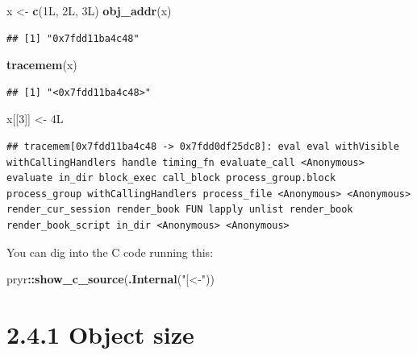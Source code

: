 \documentclass[]{book}
\newenvironment{Shaded}{\begin{snugshade}}{\end{snugshade}}
\newcommand{\DecValTok}[1]{\textcolor[rgb]{0.00,0.00,0.81}{#1}}
\newcommand{\KeywordTok}[1]{\textcolor[rgb]{0.13,0.29,0.53}{\textbf{#1}}}
\newcommand{\NormalTok}[1]{#1}
\newcommand{\OperatorTok}[1]{\textcolor[rgb]{0.81,0.36,0.00}{\textbf{#1}}}
\newcommand{\StringTok}[1]{\textcolor[rgb]{0.31,0.60,0.02}{#1}}
\begin{document}
\begin{Shaded}
\begin{Highlighting}[]
\NormalTok{x <-}\StringTok{ }\KeywordTok{c}\NormalTok{(1L, 2L, 3L)}
\KeywordTok{obj_addr}\NormalTok{(x)}
\end{Highlighting}
\end{Shaded}

\begin{verbatim}
## [1] "0x7fdd11ba4c48"
\end{verbatim}

\begin{Shaded}
\begin{Highlighting}[]
\KeywordTok{tracemem}\NormalTok{(x)}
\end{Highlighting}
\end{Shaded}

\begin{verbatim}
## [1] "<0x7fdd11ba4c48>"
\end{verbatim}

\begin{Shaded}
\begin{Highlighting}[]
\NormalTok{x[[}\DecValTok{3}\NormalTok{]] <-}\StringTok{ }\NormalTok{4L}
\end{Highlighting}
\end{Shaded}

\begin{verbatim}
## tracemem[0x7fdd11ba4c48 -> 0x7fdd0df25dc8]: eval eval withVisible withCallingHandlers handle timing_fn evaluate_call <Anonymous> evaluate in_dir block_exec call_block process_group.block process_group withCallingHandlers process_file <Anonymous> <Anonymous> render_cur_session render_book FUN lapply unlist render_book render_book_script in_dir <Anonymous> <Anonymous>
\end{verbatim}

You can dig into the C code running this:

\begin{Shaded}
\begin{Highlighting}[]
\NormalTok{pryr}\OperatorTok{::}\KeywordTok{show_c_source}\NormalTok{(}\KeywordTok{.Internal}\NormalTok{(}\StringTok{"[<-"}\NormalTok{))}
\end{Highlighting}
\end{Shaded}

\hypertarget{object-size}{%
\section*{2.4.1 Object size}\label{object-size}}
\end{document}
